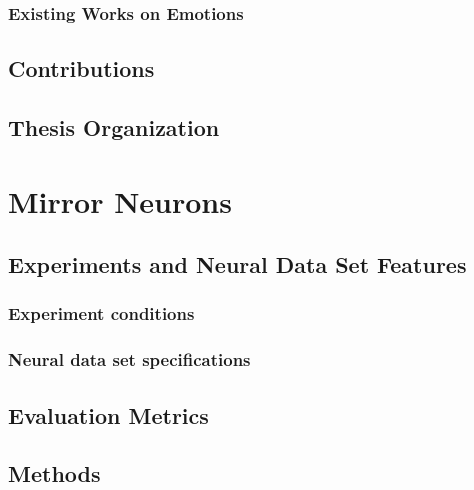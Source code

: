 \documentclass[a4,12pt]{ozu-thesis}
\begin{document}
\subsection{Existing Works on Emotions}


\newpage
\section{Contributions}



\section{Thesis Organization}


\chapter{Mirror Neurons}


\newpage
\section{Experiments and Neural Data Set Features}



\subsection{Experiment conditions}


\subsection{Neural data set specifications}


\section{Evaluation Metrics}


\section{Methods}
\end{document}

